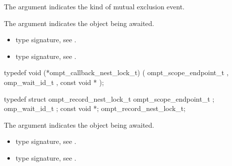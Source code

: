 \argdesc

The argument  indicates the kind of mutual exclusion event.

The argument  indicates the object being awaited.

\codeptrdesc

\crossreferences
\begin{itemize}
\item {} type signature, see
.
\item {} type signature, see
.
\end{itemize}



\label{sec:ompt_callback_nest_lock_t}
\format

\begin{ccppspecific}
\begin{omptCallback}
typedef void (*ompt_callback_nest_lock_t) (
  ompt_scope_endpoint_t ,
  omp_wait_id_t ,
  const void *
);
\end{omptCallback}
\end{ccppspecific}


\record

\begin{ccppspecific}
\begin{omptRecord}
typedef struct ompt_record_nest_lock_t {
  ompt_scope_endpoint_t ;
  omp_wait_id_t ;
  const void *;
} ompt_record_nest_lock_t;
\end{omptRecord}
\end{ccppspecific}


\argdesc

\epdesc

The argument  indicates the object being awaited.

\codeptrdesc

\crossreferences
\begin{itemize}
\item {} type signature, see
.
\item {} type signature, see
.
\end{itemize}



